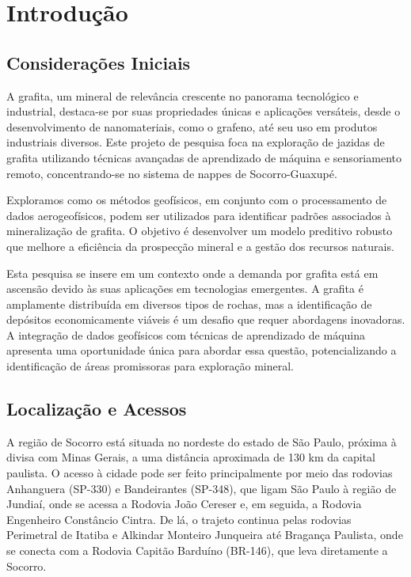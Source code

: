 \chapter{Introdução}
\section{Considerações Iniciais}
\par{A grafita, um mineral de relevância crescente no panorama tecnológico e industrial, destaca-se por suas propriedades únicas e aplicações versáteis, desde o desenvolvimento de nanomateriais, como o grafeno, até seu uso em produtos industriais diversos. Este projeto de pesquisa foca na exploração de jazidas de grafita utilizando técnicas avançadas de aprendizado de máquina e sensoriamento remoto, concentrando-se no sistema de nappes de Socorro-Guaxupé.}

\par{Exploramos como os métodos geofísicos, em conjunto com o processamento de dados aerogeofísicos, podem ser utilizados para identificar padrões associados à mineralização de grafita. O objetivo é desenvolver um modelo preditivo robusto que melhore a eficiência da prospecção mineral e a gestão dos recursos naturais.}

\par{Esta pesquisa se insere em um contexto onde a demanda por grafita está em ascensão devido às suas aplicações em tecnologias emergentes. A grafita é amplamente distribuída em diversos tipos de rochas, mas a identificação de depósitos economicamente viáveis é um desafio que requer abordagens inovadoras. A integração de dados geofísicos com técnicas de aprendizado de máquina apresenta uma oportunidade única para abordar essa questão, potencializando a identificação de áreas promissoras para exploração mineral.}

\section{Localização e Acessos}
\par{A região de Socorro está situada no nordeste do estado de São Paulo, próxima à divisa com Minas Gerais, a uma distância aproximada de 130 km da capital paulista. O acesso à cidade pode ser feito principalmente por meio das rodovias Anhanguera (SP-330) e Bandeirantes (SP-348), que ligam São Paulo à região de Jundiaí, onde se acessa a Rodovia João Cereser e, em seguida, a Rodovia Engenheiro Constâncio Cintra. De lá, o trajeto continua pelas rodovias Perimetral de Itatiba e Alkindar Monteiro Junqueira até Bragança Paulista, onde se conecta com a Rodovia Capitão Barduíno (BR-146), que leva diretamente a Socorro.}

